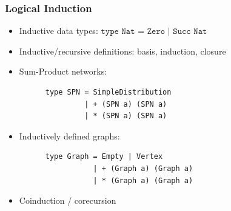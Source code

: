 \documentclass{beamer}
\begin{document}
  \begin{frame}[fragile]
    \frametitle{Logical Induction}
    \begin{itemize}
      \item Inductive data types: $\texttt{type Nat = Zero | Succ Nat}$
      \item Inductive/recursive definitions: basis, induction, closure
      \item Sum-Product networks:
      \begin{lstlisting}
      type SPN = SimpleDistribution
               | + (SPN a) (SPN a)
               | * (SPN a) (SPN a)
      \end{lstlisting}
      \item Inductively defined graphs:
      \begin{lstlisting}
      type Graph = Empty | Vertex
                 | + (Graph a) (Graph a)
                 | * (Graph a) (Graph a)
      \end{lstlisting}
      \item Coinduction / corecursion
    \end{itemize}
  \end{frame}
\end{document}
